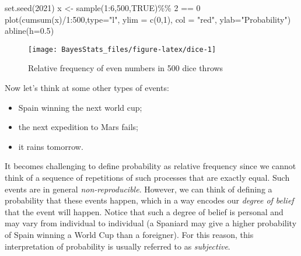 \documentclass[
]{book}
\newenvironment{Shaded}{\begin{snugshade}}{\end{snugshade}}
\newcommand{\AttributeTok}[1]{\textcolor[rgb]{0.77,0.63,0.00}{#1}}
\newcommand{\ConstantTok}[1]{\textcolor[rgb]{0.00,0.00,0.00}{#1}}
\newcommand{\DecValTok}[1]{\textcolor[rgb]{0.00,0.00,0.81}{#1}}
\newcommand{\FloatTok}[1]{\textcolor[rgb]{0.00,0.00,0.81}{#1}}
\newcommand{\FunctionTok}[1]{\textcolor[rgb]{0.00,0.00,0.00}{#1}}
\newcommand{\NormalTok}[1]{#1}
\newcommand{\OtherTok}[1]{\textcolor[rgb]{0.56,0.35,0.01}{#1}}
\newcommand{\SpecialCharTok}[1]{\textcolor[rgb]{0.00,0.00,0.00}{#1}}
\newcommand{\StringTok}[1]{\textcolor[rgb]{0.31,0.60,0.02}{#1}}
\begin{document}
\begin{Shaded}
\begin{Highlighting}[]
\FunctionTok{set.seed}\NormalTok{(}\DecValTok{2021}\NormalTok{)}
\NormalTok{x }\OtherTok{\textless{}{-}} \FunctionTok{sample}\NormalTok{(}\DecValTok{1}\SpecialCharTok{:}\DecValTok{6}\NormalTok{,}\DecValTok{500}\NormalTok{,}\ConstantTok{TRUE}\NormalTok{)}\SpecialCharTok{\%\%} \DecValTok{2} \SpecialCharTok{==} \DecValTok{0}
\FunctionTok{plot}\NormalTok{(}\FunctionTok{cumsum}\NormalTok{(x)}\SpecialCharTok{/}\DecValTok{1}\SpecialCharTok{:}\DecValTok{500}\NormalTok{,}\AttributeTok{type=}\StringTok{"l"}\NormalTok{, }\AttributeTok{ylim =} \FunctionTok{c}\NormalTok{(}\DecValTok{0}\NormalTok{,}\DecValTok{1}\NormalTok{), }\AttributeTok{col =} \StringTok{"red"}\NormalTok{, }\AttributeTok{ylab=}\StringTok{"Probability"}\NormalTok{)}
\FunctionTok{abline}\NormalTok{(}\AttributeTok{h=}\FloatTok{0.5}\NormalTok{)}
\end{Highlighting}
\end{Shaded}

\begin{figure}

{\centering \texttt{[image: BayesStats\_files/figure-latex/dice-1]} 

}

\caption{Relative frequency of even numbers in 500 dice throws}\label{fig:dice}
\end{figure}

Now let's think at some other types of events:

\begin{itemize}
\item
  Spain winning the next world cup;
\item
  the next expedition to Mars fails;
\item
  it rains tomorrow.
\end{itemize}

It becomes challenging to define probability as relative frequency since we cannot think of a sequence of repetitions of such processes that are exactly equal. Such events are in general \emph{non-reproducible}. However, we can think of defining a probability that these events happen, which in a way encodes our \emph{degree of belief} that the event will happen. Notice that such a degree of belief is personal and may vary from individual to individual (a Spaniard may give a higher probability of Spain winning a World Cup than a foreigner). For this reason, this interpretation of probability is usually referred to as \emph{subjective}.
\end{document}
